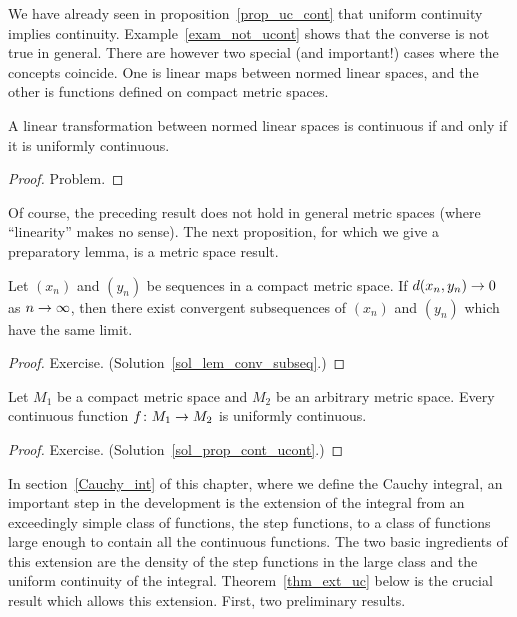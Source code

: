 We have already seen in proposition~\ref{prop_uc_cont} that uniform continuity implies
continuity.  Example~\ref{exam_not_ucont} shows that the converse is not true in general.
There are however two special (and important!) cases where the concepts coincide.  One is
linear maps between normed linear spaces, and the other is functions defined on compact metric
spaces.

\begin{prop}\label{prop_lin_ucont}  A linear transformation between normed linear spaces is
continuous if and only if it is uniformly continuous.
\end{prop}

\begin{proof} Problem.  \ns  \end{proof}

Of course, the preceding result does not hold in general metric spaces (where ``linearity''
makes no sense).  The next proposition, for which we give a preparatory lemma, is a metric
space result.

\begin{lem}\label{lem_conv_subseq}  Let $(x_n)$ and $(y_n)$ be sequences in a compact metric
space.  If $d(x_n,y_n) \rightarrow 0$ as $n \rightarrow \infty$, then there exist convergent subsequences of
$(x_n)$ and $(y_n)$ which have the same limit.
\end{lem}

\begin{proof} Exercise.  (Solution~\ref{sol_lem_conv_subseq}.) \ns  \end{proof}

\begin{prop}\label{prop_cont_ucont}  Let $M_1$ be a compact metric space and $M_2$ be an arbitrary
metric space.  Every continuous function $f \colon M_1 \rightarrow M_2$ is uniformly continuous.
\end{prop}

\begin{proof} Exercise.  (Solution~\ref{sol_prop_cont_ucont}.) \ns   \end{proof}


In section~\ref{Cauchy_int} of this chapter, where we define the Cauchy integral, an important
step in the development is the extension of the integral from an exceedingly simple class of
functions, the step functions, to a class of functions large enough to contain all the
continuous functions.  The two basic ingredients of this extension are the density of the step
functions in the large class and the uniform continuity of the integral.
Theorem~\ref{thm_ext_uc} below is the crucial result which allows this extension.  First, two
preliminary results.

